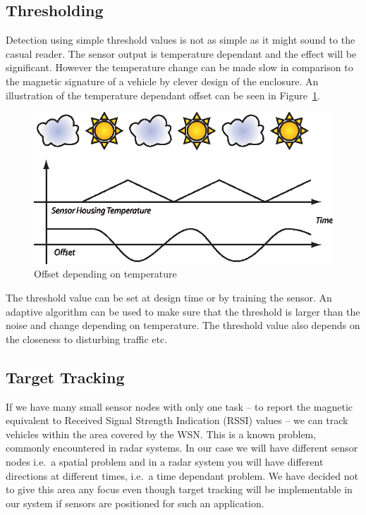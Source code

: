 \subsection{Thresholding}
Detection using simple threshold values is not as simple as it might sound to the casual reader. The sensor output is temperature dependant and the effect will be significant. However the temperature change can be made slow in comparison to the magnetic signature of a vehicle by clever design of the enclosure. An illustration of the temperature dependant offset can be seen in Figure~\ref{fig:offset}.
\begin{figure}[htb]
 \centering
 \begin{minipage}{0.6\linewidth}
 \centering
 \includegraphics[width=\linewidth]{images/offset}
 \caption{Offset depending on temperature}
 \label{fig:offset}
 \end{minipage}
\end{figure}

The threshold value can be set at design time or by training the sensor. An adaptive algorithm can be used to make sure that the threshold is larger than the noise and change depending on temperature. The threshold value also depends on the closeness to disturbing traffic etc.

\subsection{Target Tracking}
If we have many small sensor nodes with only one task -- to report the magnetic equivalent to Received Signal Strength Indication (RSSI) values -- we can track vehicles within the area covered by the WSN. This is a known problem, commonly encountered in radar systems. In our case we will have different sensor nodes i.e.\ a spatial problem and in a radar system you will have different directions at different times, i.e.\ a time dependant problem. We have decided not to give this area any focus even though target tracking will be implementable in our system if sensors are positioned for such an application.

